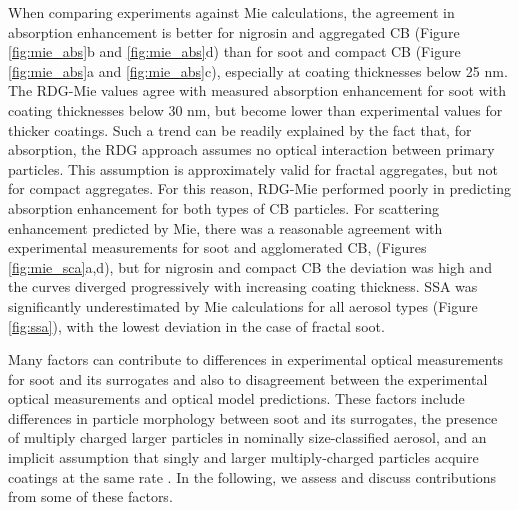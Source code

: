
When comparing experiments against Mie calculations, the agreement in absorption enhancement is better for nigrosin and aggregated CB (Figure \ref{fig:mie_abs}b and \ref{fig:mie_abs}d) than for soot and compact CB (Figure \ref{fig:mie_abs}a and \ref{fig:mie_abs}c), especially at coating thicknesses below 25 nm. The RDG-Mie values agree with measured absorption enhancement for soot with coating thicknesses below 30 nm, but become lower than experimental values for thicker coatings. Such a trend can be readily explained by the fact that, for absorption, the RDG approach assumes no optical interaction between primary particles. This assumption is approximately valid for fractal aggregates, but not for compact aggregates. For this reason, RDG-Mie performed poorly in predicting absorption enhancement for both types of CB particles. For scattering enhancement predicted by Mie, there was a reasonable agreement with experimental measurements for soot and agglomerated CB, (Figures \ref{fig:mie_sca}a,d), but for nigrosin and compact CB the deviation was high and the curves diverged progressively with increasing coating thickness. SSA was significantly underestimated by Mie calculations for all aerosol types (Figure \ref{fig:ssa}), with the lowest deviation in the case of fractal soot.

Many factors can contribute to differences in experimental optical measurements for soot and its surrogates and also to disagreement between the experimental optical measurements and optical model predictions. These factors include differences in particle morphology between soot and its surrogates, the presence of multiply charged larger particles in nominally size-classified aerosol, and an implicit assumption that singly and larger multiply-charged particles acquire coatings at the same rate \citep{RN75}. In the following, we assess and discuss contributions from some of these factors.

